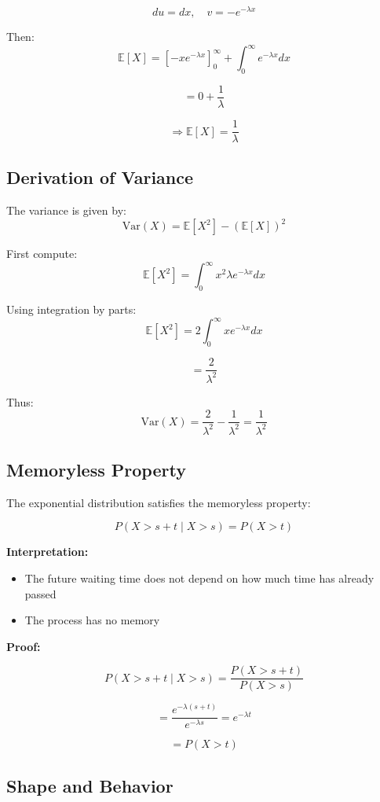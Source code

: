 \documentclass[10pt,a4paper]{article}
\begin{document}
		\[
		du = dx, \quad v = -e^{-\lambda x}
		\]
		
		Then:
		\[
		\mathbb{E}[X] = \left[-x e^{-\lambda x}\right]_0^\infty + \int_0^\infty e^{-\lambda x} dx
		\]
		
		\[
		= 0 + \frac{1}{\lambda}
		\]
		
		\[
		\Rightarrow \mathbb{E}[X] = \frac{1}{\lambda}
		\]
		
		\subsection{Derivation of Variance}
		
		The variance is given by:
		\[
		\mathrm{Var}(X) = \mathbb{E}[X^2] - (\mathbb{E}[X])^2
		\]
		
		First compute:
		\[
		\mathbb{E}[X^2] = \int_0^\infty x^2 \lambda e^{-\lambda x} dx
		\]
		
		Using integration by parts:
		\[
		\mathbb{E}[X^2] = 2 \int_0^\infty x e^{-\lambda x} dx
		\]
		
		\[
		= \frac{2}{\lambda^2}
		\]
		
		Thus:
		\[
		\mathrm{Var}(X) = \frac{2}{\lambda^2} - \frac{1}{\lambda^2}
		= \frac{1}{\lambda^2}
		\]
		
		\subsection{Memoryless Property}
		
		The exponential distribution satisfies the memoryless property:
		
		
		\[
		P(X > s + t \mid X > s) = P(X > t)
		\]
		
		
		\textbf{Interpretation:}
		\begin{itemize}
		    \item The future waiting time does not depend on how much time has already passed
		    \item The process has no memory
		\end{itemize}
		
		\textbf{Proof:}
		
		\[
		P(X > s+t \mid X > s) = \frac{P(X > s+t)}{P(X > s)}
		\]
		
		\[
		= \frac{e^{-\lambda (s+t)}}{e^{-\lambda s}} = e^{-\lambda t}
		\]
		
		\[
		= P(X > t)
		\]
		
		\subsection{Shape and Behavior}
		
\end{document}
